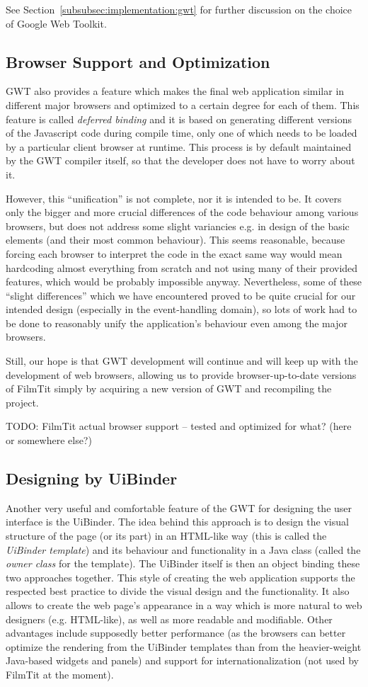 See Section~\ref{subsubsec:implementation:gwt} for further discussion on the choice of Google Web Toolkit.

\subsection{Browser Support and Optimization}
GWT also provides a feature which makes the final web application similar in different major browsers and optimized to a certain degree for each of them. This feature is called {\em deferred binding} and it is based on generating different versions of the Javascript code during compile time, only one of which needs to be loaded by a particular client browser at runtime. This process is by default maintained by the GWT compiler itself, so that the developer does not have to worry about it.

However, this ``unification'' is not complete, nor it is intended to be. It covers only the bigger and more crucial differences of the code behaviour among various browsers, but does not address some slight variancies e.g. in design of the basic elements (and their most common behaviour). This seems reasonable, because forcing each browser to interpret the code in the exact same way would mean hardcoding almost everything from scratch and not using many of their provided features, which would be probably impossible anyway. Nevertheless, some of these ``slight differences'' which we have encountered proved to be quite crucial for our intended design (especially in the event-handling domain), so lots of work had to be done to reasonably unify the application's behaviour even among the major browsers.

Still, our hope is that GWT development will continue and will keep up with the development of web browsers, allowing us to provide browser-up-to-date versions of FilmTit simply by acquiring a new version of GWT and recompiling the project.

TODO: FilmTit actual browser support -- tested and optimized for what? (here or somewhere else?)

\subsection{Designing by UiBinder}
Another very useful and comfortable feature of the GWT for designing the user interface is the UiBinder. The idea behind this approach is to design the visual structure of the page (or its part) in an HTML-like way (this is called the {\em UiBinder template}) and its behaviour and functionality in a Java class (called the {\em owner class} for the template). The UiBinder itself is then an object binding these two approaches together. This style of creating the web application supports the respected best practice to divide the visual design and the functionality. It also allows to create the web page's appearance in a way which is more natural to web designers (e.g. HTML-like), as well as more readable and modifiable. Other advantages include supposedly better performance (as the browsers can better optimize the rendering from the UiBinder templates than from the heavier-weight Java-based widgets and panels) and support for internationalization (not used by FilmTit at the moment).

